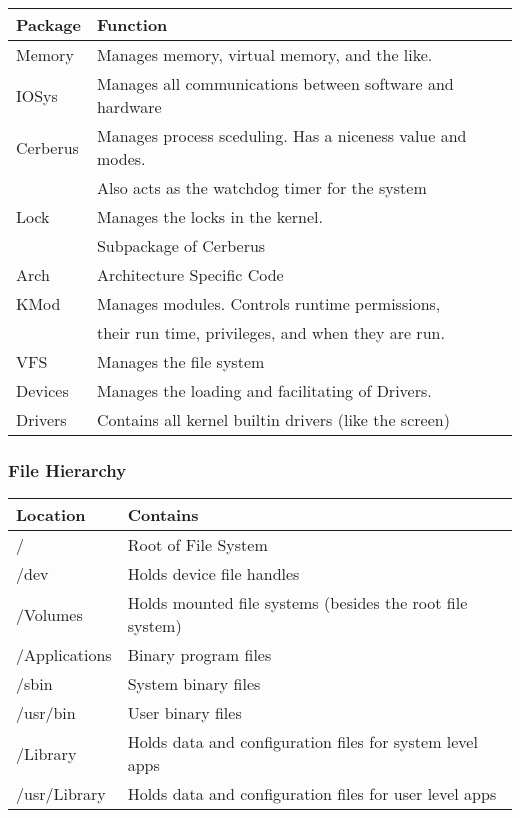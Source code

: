 \documentclass[12pt]{article}
\begin{document}
\noindent\begin{tabular}{|l|l|}
\hline
    Package & Function\\
\hline
    Memory   & Manages memory, virtual memory, and the like.\\
	IOSys    & Manages all communications between software and hardware\\
	Cerberus & Manages process sceduling. Has a niceness value and modes.\\
             & Also acts as the watchdog timer for the system\\
    Lock     & Manages the locks in the kernel. \\
             & Subpackage of Cerberus\\
	Arch     & Architecture Specific Code\\
	KMod     & Manages modules. Controls runtime permissions, \\
             &their run time, privileges, and when they are run.\\
	
	VFS      & Manages the file system\\
	Devices  & Manages the loading and facilitating of Drivers.\\
    Drivers  & Contains all kernel builtin drivers (like the screen)\\
	\hline
\end{tabular}
\subsubsection{File Hierarchy}

\begin{tabular}{|l|l|}
\hline
Location & Contains \\
\hline
/ & Root of File System \\
/dev & Holds device file handles\\
/Volumes & Holds mounted file systems (besides the root file system)\\
/Applications & Binary program files\\
/sbin & System binary files\\
/usr/bin & User binary files\\
/Library & Holds data and configuration files for system level apps\\
/usr/Library & Holds data and configuration files for user level apps\\
\hline
\end{tabular}
\end{document}
